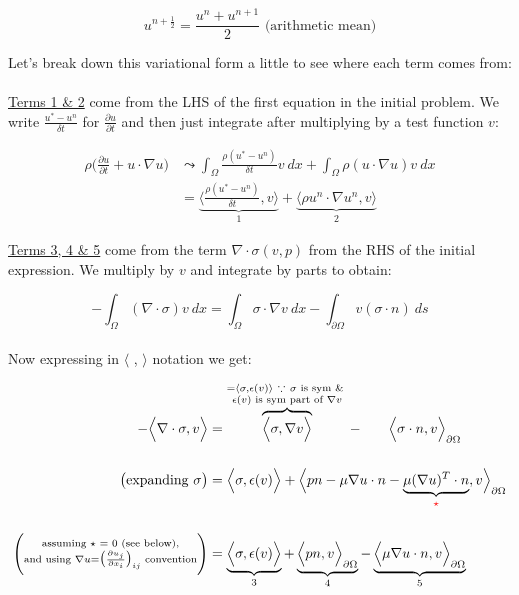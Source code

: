 \documentclass[english, 11pt]{article}
\newcommand{\Langle}{\Big\langle}
\newcommand{\Rangle}{\Big\rangle}
\begin{document}
$$ u^{n+\frac{1}{2}} = \frac{u^n + u^{n+1}}{2} \text{ (arithmetic mean)}$$

Let's break down this variational form a little to see where each term comes from:\\
\\

\underline{Terms 1 \& 2} come from the LHS of the first equation in the initial problem. We write $\frac{u^* - u^n}{\delta t}$ for $\frac{\partial u}{\partial t}$ and then just integrate after multiplying by a test function $v$:

\begin{align*}
	\rho \Big( \frac{\partial u}{\partial t} + u \cdot \nabla u \Big) &\leadsto \int_\Omega \frac{\rho(u^* - u^n)}{\delta t} v \ dx + \int_{\Omega} \rho(u \cdot \nabla u)v \ dx \\[0.5cm]
	&= \underbrace{\Langle \frac{\rho (u^* - u^n)}{\delta t} , v \Big\rangle}_1 + \underbrace{\Big\langle \rho u^n \cdot \nabla u^n , v \Rangle}_2
\end{align*}


\underline{Terms 3, 4 \& 5} come from the term $\nabla \cdot \sigma(v,p)$ from the RHS of the initial expression. We multiply by $v$ and integrate by parts to obtain:

\[ - \int_\Omega (\nabla \cdot \sigma)v \ dx = \int_\Omega \sigma \cdot \nabla v \ dx - \int_{\partial\Omega} v(\sigma \cdot n) \ ds \]
\\

Now expressing in $\langle$ , $\rangle$ notation we get:

\begin{align*}
	- \Langle \nabla \cdot \sigma, v \Rangle &= \overbrace{\Langle \sigma, \nabla v \Rangle}^{\substack{= \langle \sigma , \epsilon(v) \rangle \ \because \ \sigma \text{ is sym \& } \\ \epsilon(v) \text{ is sym part of } \nabla v}} - \qquad \Langle \sigma \cdot n, v \Rangle_{\partial \Omega}  \\[0.5cm]
	\big(\text{expanding } \sigma \big) &= \Langle \sigma, \epsilon(v) \Rangle + \Langle pn - \mu \nabla u \cdot n - \underbrace{\mu (\nabla u)^T \cdot n}_{\textcolor{red}{\star}}, v \Rangle_{\partial\Omega} \\[0.5cm]
	\Bigg(\substack{\text{assuming $\star$ = 0 (see below),} \\ \text{and using } \nabla u = \big( \frac{\partial u_j}{\partial x_i} \big)_{ij} \text{ convention}} \Bigg) &= \underbrace{\Langle \sigma , \epsilon(v) \Rangle}_3 + \underbrace{\Langle pn, v \Rangle_{\partial\Omega}}_4 - \underbrace{\Langle \mu \nabla u \cdot n, v \Rangle_{\partial\Omega}}_5
\end{align*}
\\
\end{document}
